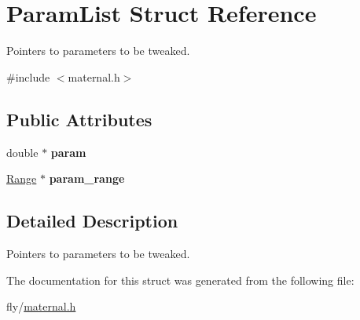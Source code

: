 \hypertarget{structParamList}{
\section{ParamList Struct Reference}
\label{structParamList}
}


Pointers to parameters to be tweaked.  


{\ttfamily \#include $<$maternal.h$>$}\subsection*{Public Attributes}
\begin{DoxyCompactItemize}
\item 
\hypertarget{structParamList_a0b840aaef901a21056d342f89520e2d7}{
double $\ast$ {\bfseries param}}
\label{structParamList_a0b840aaef901a21056d342f89520e2d7}

\item 
\hypertarget{structParamList_a7207b750736f2c5b9cfeb99bb51431db}{
\hyperlink{structRange}{Range} $\ast$ {\bfseries param\_\-range}}
\label{structParamList_a7207b750736f2c5b9cfeb99bb51431db}

\end{DoxyCompactItemize}


\subsection{Detailed Description}
Pointers to parameters to be tweaked. 

The documentation for this struct was generated from the following file:\begin{DoxyCompactItemize}
\item 
fly/\hyperlink{maternal_8h}{maternal.h}\end{DoxyCompactItemize}
